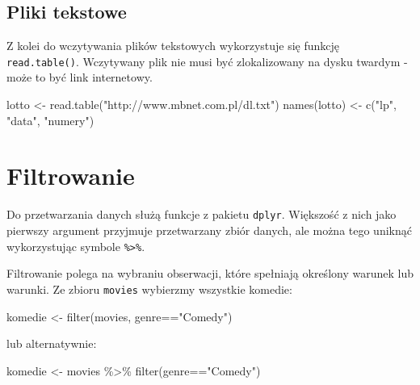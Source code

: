 \documentclass[
]{book}
\newenvironment{Shaded}{\begin{snugshade}}{\end{snugshade}}
\newcommand{\FunctionTok}[1]{\textcolor[rgb]{0.00,0.00,0.00}{#1}}
\newcommand{\NormalTok}[1]{#1}
\newcommand{\OtherTok}[1]{\textcolor[rgb]{0.56,0.35,0.01}{#1}}
\newcommand{\SpecialCharTok}[1]{\textcolor[rgb]{0.00,0.00,0.00}{#1}}
\newcommand{\StringTok}[1]{\textcolor[rgb]{0.31,0.60,0.02}{#1}}
\begin{document}
\hypertarget{pliki-tekstowe}{%
\subsection{Pliki tekstowe}\label{pliki-tekstowe}}

Z kolei do wczytywania plików tekstowych wykorzystuje się funkcję \texttt{read.table()}. Wczytywany plik nie musi być zlokalizowany na dysku twardym - może to być link internetowy.

\begin{Shaded}
\begin{Highlighting}[]
\NormalTok{lotto }\OtherTok{\textless{}{-}} \FunctionTok{read.table}\NormalTok{(}\StringTok{"http://www.mbnet.com.pl/dl.txt"}\NormalTok{)}
\FunctionTok{names}\NormalTok{(lotto) }\OtherTok{\textless{}{-}} \FunctionTok{c}\NormalTok{(}\StringTok{"lp"}\NormalTok{, }\StringTok{"data"}\NormalTok{, }\StringTok{"numery"}\NormalTok{)}
\end{Highlighting}
\end{Shaded}

\hypertarget{filtrowanie}{%
\section{Filtrowanie}\label{filtrowanie}}

Do przetwarzania danych służą funkcje z pakietu \texttt{dplyr}. Większość z nich jako pierwszy argument przyjmuje przetwarzany zbiór danych, ale można tego uniknąć wykorzystując symbole \texttt{\%\textgreater{}\%}.

Filtrowanie polega na wybraniu obserwacji, które spełniają określony warunek lub warunki. Ze zbioru \texttt{movies} wybierzmy wszystkie komedie:

\begin{Shaded}
\begin{Highlighting}[]
\NormalTok{komedie }\OtherTok{\textless{}{-}} \FunctionTok{filter}\NormalTok{(movies, genre}\SpecialCharTok{==}\StringTok{"Comedy"}\NormalTok{)}
\end{Highlighting}
\end{Shaded}

lub alternatywnie:

\begin{Shaded}
\begin{Highlighting}[]
\NormalTok{komedie }\OtherTok{\textless{}{-}}\NormalTok{ movies }\SpecialCharTok{\%\textgreater{}\%}
  \FunctionTok{filter}\NormalTok{(genre}\SpecialCharTok{==}\StringTok{"Comedy"}\NormalTok{)}
\end{Highlighting}
\end{Shaded}
\end{document}
